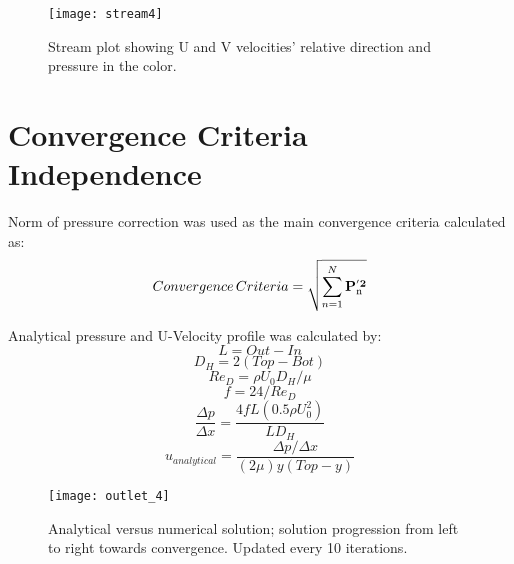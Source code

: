 \documentclass[10pt,english]{article}
\begin{document}
\vspace{-10pt}
\begin{figure}[H]
\centering
\texttt{[image: stream4]}
\vspace{-5pt}
\caption{Stream plot showing U and V velocities' relative direction and pressure in the color.}
\label{f:3b}
\end{figure}




\FloatBarrier
\section{Convergence Criteria Independence}



\noindent Norm of pressure correction was used as the main convergence criteria calculated as:
    \begin{equation}
      Convergence\,Criteria = \sqrt{\sum_{n=1}^N \bf P_{\rm n}^{'2}}
    \end{equation}


\noindent Analytical pressure and U-Velocity profile was calculated by: 
\begin{equation}
            L = Out-In
\end{equation}
\begin{equation}
            D_H = 2 (Top-Bot)
            \end{equation}
            \begin{equation}
            Re_D = \rho U_0 D_H / \mu
            \end{equation}
            \begin{equation}
            f = 24/Re_D
            \end{equation}
            \begin{equation}
            \frac{\Delta p}{\Delta x} = \frac{4 f L (0.5 \rho U_0^2)}{L D_H}
            \end{equation}
            \begin{equation}
            u_{analytical} = \frac{{\Delta p}/{\Delta x}}{(2 \mu) y (Top-y)}
            \end{equation}
      
\begin{figure}[H]
\centering
\texttt{[image: outlet\_4]}
\vspace{-5pt}
\caption{Analytical versus numerical solution; solution progression from left to right towards convergence.  Updated every 10 iterations. }
\label{f:3b}
\end{figure}
\end{document}
